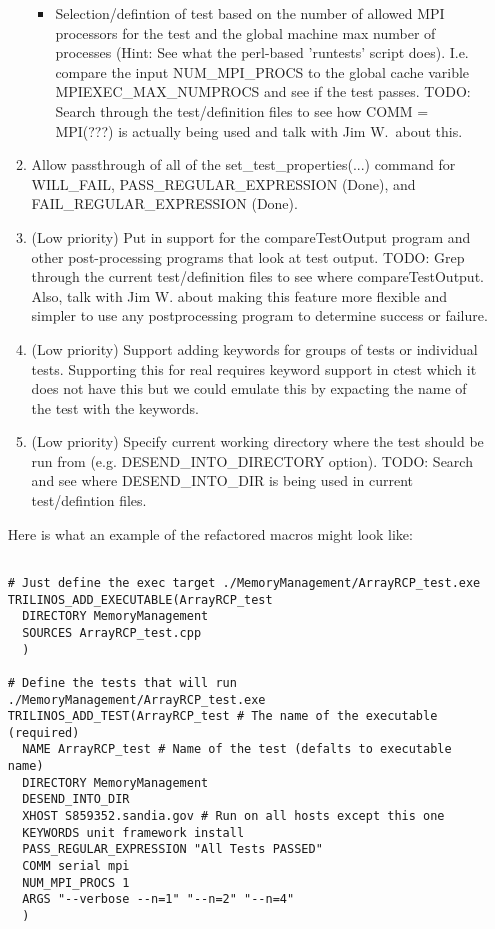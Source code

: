 \documentclass[pdf,ps2pdf,11pt]{SANDreport}
\begin{document}
\begin{enumerate}
\begin{enumerate}
\begin{itemize}
    {}\item Selection/defintion of test based on the number of allowed
    MPI processors for the test and the global machine max number of
    processes (Hint: See what the perl-based 'runtests' script does).
    I.e. compare the input NUM\_MPI\_PROCS to the global cache varible
    MPIEXEC\_MAX\_NUMPROCS and see if the test passes.  TODO: Search
    through the test/definition files to see how COMM = MPI(???) is
    actually being used and talk with Jim W.\ about this.
	
    \end{itemize}

  {}\item Allow passthrough of all of the set\_test\_properties(...) 
  command for WILL\_FAIL, PASS\_REGULAR\_EXPRESSION (Done), and
  FAIL\_REGULAR\_EXPRESSION (Done).

  {}\item (Low priority) Put in support for the compareTestOutput
  program and other post-processing programs that look at test output.
  TODO: Grep through the current test/definition files to see where
  compareTestOutput.  Also, talk with Jim W. about making this feature
  more flexible and simpler to use any postprocessing program to
  determine success or failure.

  {}\item (Low priority) Support adding keywords for groups of tests
  or individual tests.  Supporting this for real requires keyword
  support in ctest which it does not have this but we could emulate
  this by expacting the name of the test with the keywords.

  {}\item (Low priority) Specify current working directory where the
  test should be run from (e.g. DESEND\_INTO\_DIRECTORY option).
  TODO: Search and see where DESEND\_INTO\_DIR is being used in
  current test/defintion files.

  \end{enumerate}

Here is what an example of the refactored macros might look like:

\begin{verbatim}

# Just define the exec target ./MemoryManagement/ArrayRCP_test.exe
TRILINOS_ADD_EXECUTABLE(ArrayRCP_test
  DIRECTORY MemoryManagement
  SOURCES ArrayRCP_test.cpp
  )

# Define the tests that will run ./MemoryManagement/ArrayRCP_test.exe
TRILINOS_ADD_TEST(ArrayRCP_test # The name of the executable (required)
  NAME ArrayRCP_test # Name of the test (defalts to executable name)
  DIRECTORY MemoryManagement
  DESEND_INTO_DIR
  XHOST S859352.sandia.gov # Run on all hosts except this one
  KEYWORDS unit framework install
  PASS_REGULAR_EXPRESSION "All Tests PASSED"
  COMM serial mpi
  NUM_MPI_PROCS 1
  ARGS "--verbose --n=1" "--n=2" "--n=4"
  )


\end{verbatim}
\end{enumerate}
\end{document}
